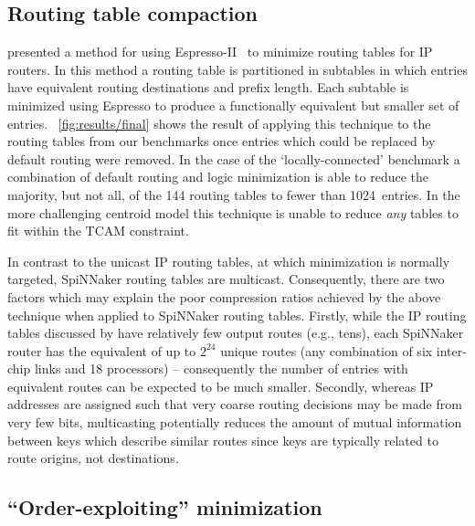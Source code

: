 \documentclass[conference]{IEEEtran}
\begin{document}
\subsection{Routing table compaction}

\textcite{Liu2002} presented a method for using Espresso-II~\parencite{Brayton1984} to minimize routing tables for IP routers.
In this method a routing table is partitioned in subtables in which entries have equivalent routing destinations and prefix length.
Each subtable is minimized using Espresso to produce a functionally equivalent but smaller set of entries.
\figurename~\ref{fig:results/final} shows the result of applying this technique to the routing tables from our benchmarks once entries which could be replaced by default routing were removed.
In the case of the `locally-connected' benchmark a combination of default routing and logic minimization is able to reduce the majority, but not all, of the 144 routing tables to fewer than \num{1024}~entries.
In the more challenging centroid model this technique is unable to reduce \emph{any} tables to fit within the TCAM constraint.

In contrast to the unicast IP routing tables, at which minimization is normally targeted, SpiNNaker routing tables are multicast.
Consequently, there are two factors which may explain the poor compression ratios achieved by the above technique when applied to SpiNNaker routing tables.
Firstly, while the IP routing tables discussed by \textcite{Liu2002} have relatively few output routes (e.g., tens), each SpiNNaker router has the equivalent of up to $2^{24}$ unique routes (any combination of six inter-chip links and 18 processors) -- consequently the number of entries with equivalent routes can be expected to be much smaller.
Secondly, whereas IP addresses are assigned such that very coarse routing decisions may be made from very few bits, multicasting potentially reduces the amount of mutual information between keys which describe similar routes since keys are typically related to route origins, not destinations.

\subsection{``Order-exploiting'' minimization}
\end{document}

